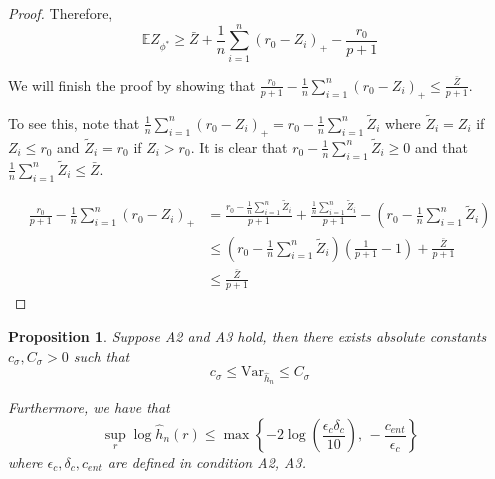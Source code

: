 \documentclass[12pt]{article}
\newtheorem{proposition}[theorem]{Proposition}
\begin{document}
\begin{proof}
Therefore,
\[
\mathbb{E} Z_{\phi^*} \geq \bar{Z} +  \frac{1}{n} \sum_{i=1}^n (r_0 - Z_i)_+ - \frac{r_0}{p+1}
\]

We will finish the proof by showing that $ \frac{r_0}{p+1} - \frac{1}{n} \sum_{i=1}^n (r_0 - Z_i)_+  \leq \frac{\bar{Z}}{p+1}$.

To see this, note that $\frac{1}{n} \sum_{i=1}^n (r_0 - Z_i)_+ = r_0 - \frac{1}{n} \sum_{i=1}^n \tilde{Z}_i$ where $\tilde{Z}_i = Z_i$ if $Z_i \leq r_0$ and $\tilde{Z}_i = r_0$ if $Z_i > r_0$. It is clear that $r_0 - \frac{1}{n} \sum_{i=1}^n \tilde{Z}_i \geq 0$ and that $\frac{1}{n} \sum_{i=1}^n \tilde{Z}_i \leq \bar{Z}$.

\begin{align*}
 \frac{r_0}{p+1} - \frac{1}{n} \sum_{i=1}^n (r_0 - Z_i)_+ &= 
        \frac{r_0 - \frac{1}{n} \sum_{i=1}^n \tilde{Z}_i}{p+1} + \frac{\frac{1}{n} \sum_{i=1}^n \tilde{Z}_i}{p+1} - (r_0 - \frac{1}{n} \sum_{i=1}^n \tilde{Z}_i) \\
  &\leq  (r_0 - \frac{1}{n} \sum_{i=1}^n \tilde{Z}_i) ( \frac{1}{p+1} - 1) + \frac{\bar{Z}}{p+1} \\
  &\leq \frac{\bar{Z}}{p+1}
\end{align*}


\end{proof}




\begin{proposition}
  \label{Prop:MLEVarPreservation}
Suppose A2 and A3 hold, then there exists absolute constants $c_{\sigma}, C_{\sigma} > 0$ such that
  \[
    c_{\sigma}  \leq  \textrm{Var}_{\hat{h}_n}  \leq C_{\sigma} 
  \]

  Furthermore, we have that
  \[
    \sup_r \log \hat{h}_n(r) \leq  \max \left\{- 2 \log \left( \frac{\epsilon_c \delta_c }{10} \right),\,
      - \frac{c_{ent}}{\epsilon_c} \right\}
  \]
  where $\epsilon_c, \delta_c, c_{ent}$ are defined in condition A2, A3.
\end{proposition}
\end{document}
